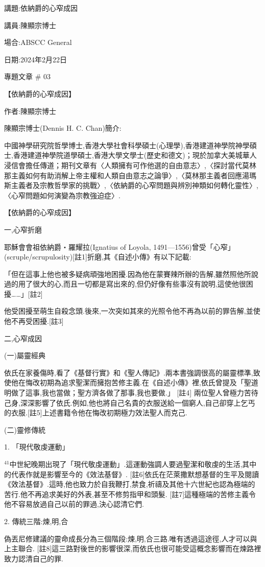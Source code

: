 \documentclass{book}
\begin{document}
講題:依納爵的心窄成因

講員:陳顯宗博士

場合:ABSCC General

日期:2024年2月22日

專題文章 \# 03

【依納爵的心窄成因】

作者:陳顯宗博士

陳顯宗博士(Dennis H. C. Chan)簡介:

中國神學研究院哲學博士,香港大學社會科學碩士(心理學),香港建道神學院神學碩士,香港建道神學院道學碩士,香港大學文學士(歷史和德文)；現於加拿大美城華人浸信會擔任傳道；期刊文章有〈人類擁有可作他選的自由意志〉,〈探討當代莫林那主義如何有助消解上帝主權和人類自由意志之論爭〉,〈莫林那主義者回應湯瑪斯主義者及宗教哲學家的挑戰〉,〈依納爵的心窄問題與辨別神類如何轉化靈性〉,〈心窄問題如何演變為宗教強迫症〉.

【依納爵的心窄成因】

一,心窄折磨

耶穌會會祖依納爵‧羅耀拉(Ignatius of Loyola, 1491—1556)曾受「心窄」(scruple/scrupulosity)[註1]折磨,其《自述小傳》有以下記載:

「但在這事上他也被多疑病頑強地困擾.因為他在蒙賽辣所辦的告解,雖然照他所說過的用了很大的心,而且一切都是寫出來的,但仍好像有些事沒有說明,這使他很困擾……」[註2]

他受困擾至萌生自殺念頭.後來,一次突如其來的光照令他不再為以前的罪告解,並使他不再受困擾.[註3]

二,心窄成因

(一)屬靈經典

依氏在家養傷時,看了《基督行實》和《聖人傳記》.兩本書強調很高的屬靈標準,致使他在悔改初期為追求聖潔而擁抱苦修主義.在《自述小傳》裡,依氏曾提及「聖道明做了這事,我也當做；聖方濟各做了那事,我也要做.」 [註4] 兩位聖人曾極力苦待己身,深深影響了依氏.例如,他也將自己名貴的衣服送給一個窮人,自己卻穿上乞丐的衣服.[註5]上述書籍令他在悔改初期極力效法聖人而克己.

(二)靈修傳統

 1. 「現代敬虔運動」


$^{41}$中世紀晚期出現了「現代敬虔運動」.這運動強調人要過聖潔和敬虔的生活,其中的代表作就是影響至今的《效法基督》. [註6]依氏在茫萊撒默想基督的生平及閱讀《效法基督》.這時,他也致力於自我鞭打,禁食,祈禱及其他十六世紀也認為極端的苦行.他不再追求美好的外表,甚至不修剪指甲和頭髮. [註7]這種極端的苦修主義令他不容易放過自己以前的罪過,決心認清它們.

 2. 傳統三階:煉,明,合

偽丟尼修建議的靈命成長分為三個階段:煉,明,合三路.唯有透過這途徑,人才可以與上主聯合. [註8]這三路對後世的影響很深,而依氏也很可能受這概念影響而在煉路裡致力認清自己的罪.
\end{document}
